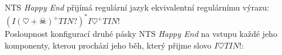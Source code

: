 \documentclass[a4paper,11pt]{article}[24.3.2010]
\begin{document}
\begin{enumerate}
NTS \emph{Happy End} přijímá regulární jazyk ekvivalentní regulárnímu výrazu: $(I(\heartsuit+\skull)^+TIN?)^*  I\heartsuit^+TIN!$\\

Posloupnost konfigurací druhé pásky NTS \emph{Happy End} na vstupu každé jeho komponenty, kterou prochází jeho běh, který přijme slovo $I\heartsuit TIN!$:

\begin{table}[ht]
        \begin{center}
        \begin{tabular}{ l  l  l  l  l  l } 

\end{tabular}
\end{center}
\end{table}
\end{enumerate}
\end{document}
